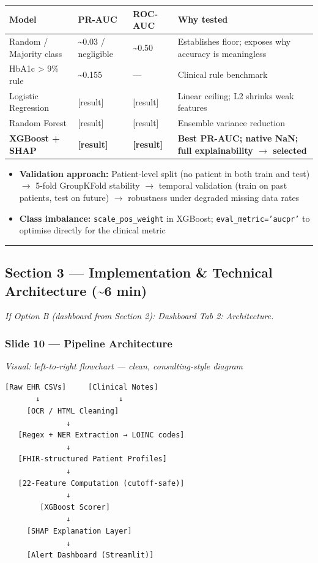 \documentclass[11pt,a4paper]{article}
\begin{document}
\begin{center}
\begin{tabular}{llll}
\toprule
Model & PR-AUC & ROC-AUC & Why tested \\
\midrule
Random / Majority class & \textasciitilde{}0.03 / negligible & \textasciitilde{}0.50 & Establishes floor; exposes why accuracy is meaningless \\
HbA1c > 9\% rule & \textasciitilde{}0.155 & --- & Clinical rule benchmark \\
Logistic Regression & [result] & [result] & Linear ceiling; L2 shrinks weak features \\
Random Forest & [result] & [result] & Ensemble variance reduction \\
\textbf{XGBoost + SHAP} & \textbf{[result]} & \textbf{[result]} & \textbf{Best PR-AUC; native NaN; full explainability $\rightarrow$ selected} \\
\bottomrule
\end{tabular}
\end{center}

\begin{itemize}
\item \textbf{Validation approach:} Patient-level split (no patient in both train and test) $\rightarrow$ 5-fold GroupKFold stability $\rightarrow$ temporal validation (train on past patients, test on future) $\rightarrow$ robustness under degraded missing data rates
\item \textbf{Class imbalance:} \texttt{scale\_pos\_weight} in XGBoost; \texttt{eval\_metric='aucpr'} to optimise directly for the clinical metric
\end{itemize}

\noindent\rule{\linewidth}{0.4pt}

\subsection{Section 3 --- Implementation \& Technical Architecture (\textasciitilde{}6 min)}
\emph{If Option B (dashboard from Section 2): Dashboard Tab 2: Architecture.}

\subsubsection{Slide 10 --- Pipeline Architecture}
\emph{Visual: left-to-right flowchart --- clean, consulting-style diagram}

\begin{mdframed}[backgroundcolor=gray!10,linecolor=gray,linewidth=0.5pt]
\begin{verbatim}
[Raw EHR CSVs]     [Clinical Notes]
       ↓                  ↓
     [OCR / HTML Cleaning]
              ↓
   [Regex + NER Extraction → LOINC codes]
              ↓
   [FHIR-structured Patient Profiles]
              ↓
   [22-Feature Computation (cutoff-safe)]
              ↓
        [XGBoost Scorer]
              ↓
     [SHAP Explanation Layer]
              ↓
     [Alert Dashboard (Streamlit)]
\end{verbatim}
\end{mdframed}
\end{document}
